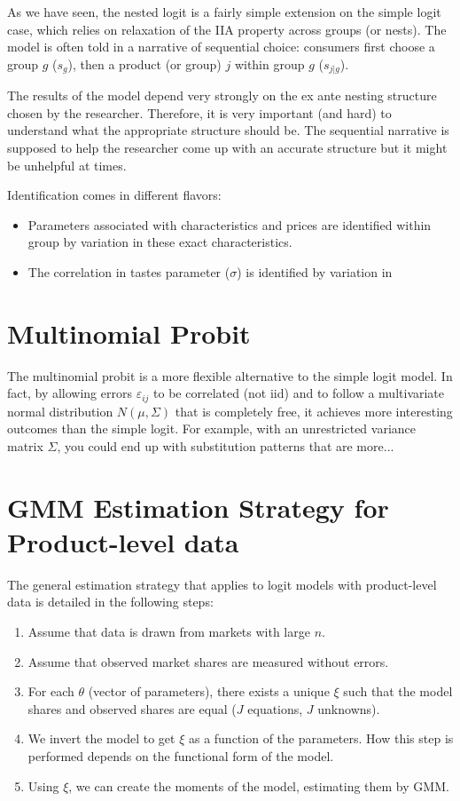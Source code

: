 As we have seen, the nested logit is a fairly simple extension on the simple logit case, which relies on relaxation of the IIA property across groups (or nests). The model is often told in a narrative of sequential choice: consumers first choose a group $g$ ($s_g$), then a product (or group) $j$ within group $g$ ($s_{j\vert g}$). 

The results of the model depend very strongly on the ex ante nesting structure chosen by the researcher. Therefore, it is very important (and hard) to understand what the appropriate structure should be. The sequential narrative is supposed to help the researcher come up with an accurate structure but it might be unhelpful at times.

Identification comes in different flavors:\begin{itemize}
\item Parameters associated with characteristics and prices are identified within group by variation in these exact characteristics.
\item The correlation in tastes parameter ($\sigma$) is identified by variation in 
\end{itemize}

\section{Multinomial Probit}

The multinomial probit is a more flexible alternative to the simple logit model. In fact, by allowing errors $\varepsilon_{ij}$ to be correlated (not iid) and to follow a multivariate normal distribution $N(\mu, \Sigma)$ that is completely free, it achieves more interesting outcomes than the simple logit. For example, with an unrestricted variance matrix $\Sigma$, you could end up with substitution patterns that are more...

\section{GMM Estimation Strategy for Product-level data}

The general estimation strategy that applies to logit models with product-level data is detailed in the following steps:\begin{enumerate}
\item Assume that data is drawn from markets with large $n$.
\item Assume that observed market shares are measured without errors.
\item For each $\theta$ (vector of parameters), there exists a unique $\xi$ such that the model shares and observed shares are equal ($J$ equations, $J$ unknowns).
\item We invert the model to get $\xi$ as a function of the parameters. How this step is performed depends on the functional form of the model.
\item Using $\xi$, we can create the moments of the model, estimating them by GMM. 
\end{enumerate}

